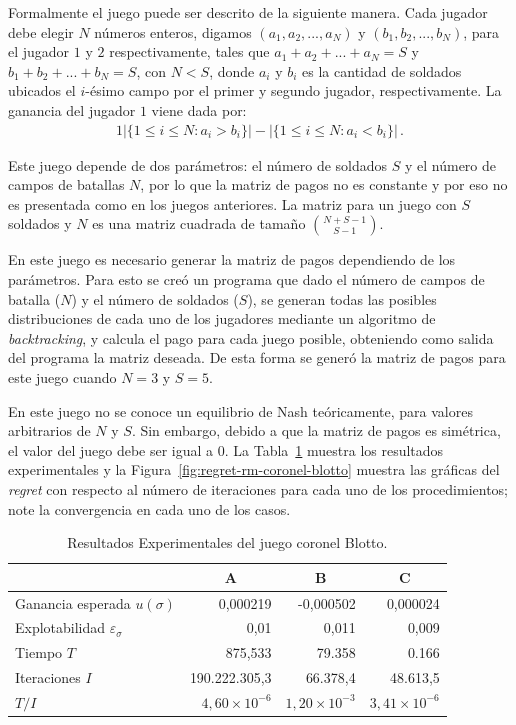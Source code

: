 Formalmente el juego puede ser descrito de la siguiente manera. Cada jugador debe elegir $N$ números enteros, digamos $(a_1, a_2, ..., a_N)$ y $(b_1, b_2, ..., b_N)$, para el jugador $1$ y $2$ respectivamente, tales que $a_1 + a_2 + ... + a_N = S$ y $b_1 + b_2 + ... + b_N = S$, con $N < S$, donde $a_i$ y $b_i$ es la cantidad de soldados ubicados el $i$-ésimo campo por el primer y segundo jugador, respectivamente. La ganancia del jugador $1$ viene dada por:
\begin{alignat}{1}
|\{ 1 \leq i \leq N : a_i > b_i\}| - |\{ 1 \leq i \leq N : a_i < b_i\}| \,.
\end{alignat}

Este juego depende de dos parámetros: el número de soldados $S$ y el número de campos de batallas $N$, por lo que la matriz de pagos no es constante y por eso no es presentada como en los juegos anteriores. La matriz para un juego con $S$ soldados y $N$ es una matriz cuadrada de tamaño $\binom{N+S-1}{S-1}$.

En este juego es necesario generar la matriz de pagos dependiendo de los parámetros. Para esto se creó un programa que dado el número de campos de batalla ($N$) y el número de soldados ($S$), se generan todas las posibles distribuciones de cada uno de los jugadores mediante un algoritmo de \textit{backtracking}, y calcula el pago para cada juego posible, obteniendo como salida del programa la matriz deseada. De esta forma se generó la matriz de pagos para este juego cuando $N = 3$ y $S = 5$.

En este juego no se conoce un equilibrio de Nash teóricamente, para valores arbitrarios de $N$ y $S$. Sin embargo, debido a que la matriz de pagos es simétrica, el valor del juego debe ser igual a $0$. La Tabla~\ref{table:resultados-rm-blotto} muestra los resultados experimentales y la Figura~\ref{fig:regret-rm-coronel-blotto} muestra las gráficas del \textit{regret} con respecto al número de iteraciones para cada uno de los procedimientos; note la convergencia en cada uno de los casos.

\begin{table}[t]
\caption{Resultados Experimentales del juego coronel Blotto.}
\label{table:resultados-rm-blotto}
\centering
\begin{tabular}{l r r r}
    \toprule
    & \multicolumn{1}{c}{A} & \multicolumn{1}{c}{B} & \multicolumn{1}{c}{C} \\ \midrule
    Ganancia esperada $u(\sigma)$ & 0,000219 & -0,000502 & 0,000024 \\
    Explotabilidad $\varepsilon_{\sigma}$ & 0,01 & 0,011 & 0,009  \\
    Tiempo $T$ &  875,533 &  79.358 & 0.166 \\
    Iteraciones $I$ &  190.222.305,3 & 66.378,4  & 48.613,5 \\
    $T/I$ & $4,60{\times}10^{-6}$ & $1,20{\times}10^{-3}$ & $3,41{\times}10^{-6}$\\
    \bottomrule
\end{tabular}
\end{table}

